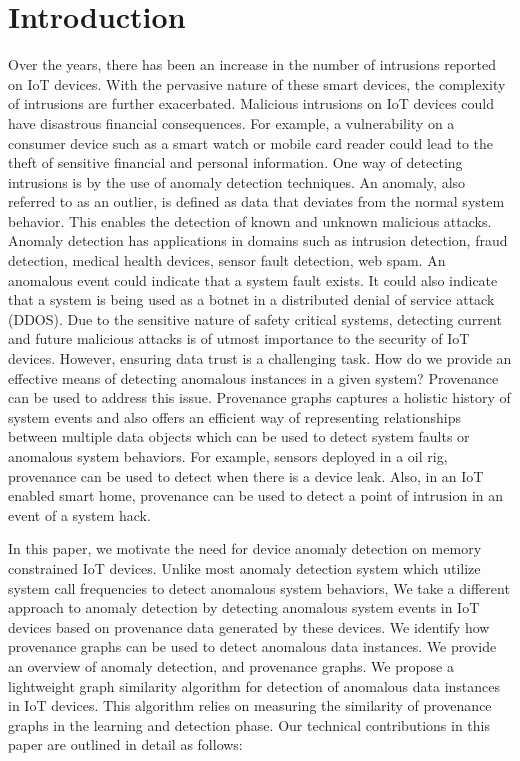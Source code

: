 \section{Introduction}
 

Over the years, there has been an increase in the number of intrusions reported on IoT devices. With the pervasive nature of these smart devices, the complexity of intrusions are further exacerbated. Malicious intrusions on IoT devices could have disastrous financial consequences. For example, a vulnerability on a consumer device such as a smart watch or mobile card reader could lead to the theft of sensitive financial and personal information. One way of detecting intrusions is by the use of anomaly detection techniques. An anomaly, also referred to as an outlier, is defined as data that deviates from the normal system behavior. This enables the detection of known and unknown malicious attacks.  Anomaly detection has applications in domains such as intrusion detection, fraud detection, medical health devices, sensor fault detection, web spam. An anomalous event could indicate that a system fault exists. It could also indicate that a system is being used as a botnet in a distributed denial of service attack (DDOS). Due to the sensitive nature of safety critical systems, detecting current and future malicious attacks is of utmost importance to the security of IoT devices. However, ensuring data trust is a challenging task. How do we provide an effective means of detecting anomalous instances in a given system? Provenance can be used to address this issue. Provenance graphs captures a holistic history of system events and also offers an efficient way of representing relationships between multiple data objects which can be used to detect system faults or anomalous system behaviors. For example, sensors deployed in a oil rig, provenance can be used to detect when there is a device leak. Also, in an IoT enabled smart home, provenance can be used to detect a point of intrusion in an event of a system hack. 

In this paper, we motivate the need for device anomaly detection on memory constrained IoT devices. Unlike most anomaly detection system which utilize system call frequencies to detect anomalous system behaviors, We take a different approach to anomaly detection by detecting anomalous system events in IoT devices based on provenance data generated by these devices. We identify how provenance graphs can be used to detect anomalous data instances. We provide an overview of anomaly detection, and provenance graphs. We propose a lightweight graph similarity algorithm for detection of anomalous data instances in IoT devices. This algorithm relies on measuring the similarity of provenance graphs in the learning and detection phase. Our technical contributions in this paper are outlined in detail as follows:



